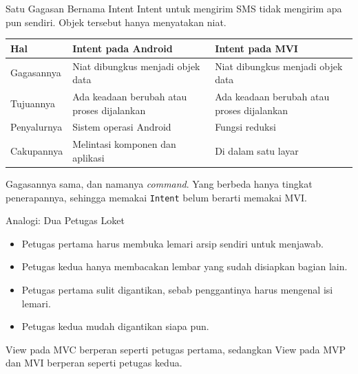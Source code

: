 \documentclass[aspectratio=169, table, 12pt]{beamer}
\begin{document}
\begin{frame}{{\Large Satu Gagasan Bernama Intent}}
  \vspace{14pt}
  {\small Intent untuk mengirim SMS tidak mengirim apa pun sendiri.
  Objek tersebut hanya menyatakan niat.}
  \vspace{5pt}
  \begin{center}\footnotesize
  \begin{tabular}{|l|p{3.7cm}|p{3.5cm}|}
    \hline
    \textbf{Hal} & \textbf{Intent pada Android} & \textbf{Intent pada MVI} \\
    \hline
    Gagasannya & Niat dibungkus menjadi objek data & Niat dibungkus menjadi objek data \\
    \hline
    Tujuannya & Ada keadaan berubah atau proses dijalankan & Ada keadaan berubah atau proses dijalankan \\
    \hline
    Penyalurnya & Sistem operasi Android & Fungsi reduksi \\
    \hline
    Cakupannya & Melintasi komponen dan aplikasi & Di dalam satu layar \\
    \hline
  \end{tabular}
  \end{center}
  \vspace{3pt}
  {\footnotesize Gagasannya sama, dan namanya \textit{command}. Yang berbeda
  hanya tingkat penerapannya, sehingga memakai \texttt{Intent} belum berarti
  memakai MVI.}
\end{frame}

\begin{frame}{{\Large Analogi: Dua Petugas Loket}}
  \vspace{10pt}
  \begin{itemize}
    \item Petugas pertama harus membuka lemari arsip sendiri untuk menjawab.
    \item Petugas kedua hanya membacakan lembar yang sudah disiapkan bagian
          lain.
    \item Petugas pertama sulit digantikan, sebab penggantinya harus mengenal
          isi lemari.
    \item Petugas kedua mudah digantikan siapa pun.
  \end{itemize}

  \vspace{10pt}
  {\small View pada MVC berperan seperti petugas pertama, sedangkan View pada
  MVP dan MVI berperan seperti petugas kedua.}
\end{frame}
\end{document}
